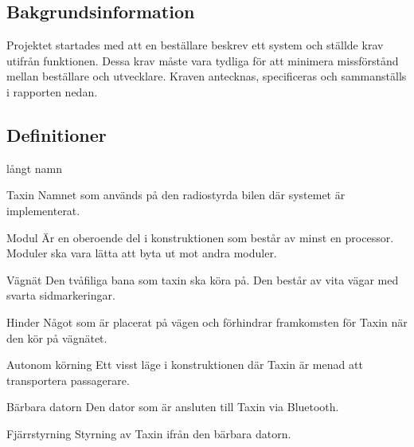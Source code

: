 \documentclass[kravspec/krav.tex]{subfiles}
\begin{document}
\subsection{Bakgrundsinformation}
Projektet startades med att en beställare beskrev ett system och ställde krav
utifrån funktionen. Dessa krav måste vara tydliga för att minimera missförstånd
mellan beställare och utvecklare. Kraven antecknas, specificeras och
sammanställs i rapporten nedan.

\subsection{Definitioner}
\begin{labeling}{långt namn}
    \item[Taxin] Namnet som används på den radiostyrda bilen där systemet är
    implementerat.
    \item[Modul] Är en oberoende del i konstruktionen som består av minst en
    processor. Moduler ska vara lätta att byta ut mot andra moduler.
    \item[Vägnät] Den tvåfiliga bana som taxin ska köra på. Den består av vita
    vägar med svarta sidmarkeringar.
    \item[Hinder] Något som är placerat på vägen och förhindrar framkomsten för
    Taxin när den kör på vägnätet.
    \item[Autonom körning] Ett visst läge i konstruktionen där Taxin är menad
    att transportera passagerare.
    \item[Bärbara datorn] Den dator som är ansluten till Taxin via Bluetooth.
    \item[Fjärrstyrning] Styrning av Taxin ifrån den bärbara datorn. 
\end{labeling}
\end{document}
